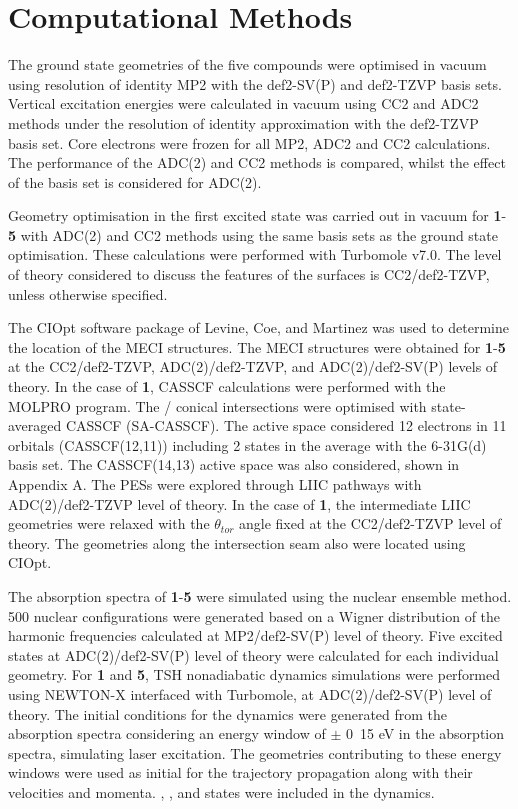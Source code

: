 \section{Computational Methods}\label{section: NRdecay_methods}
The ground state geometries of the five compounds were optimised in vacuum using resolution of identity \acf{MP2} with the def2-SV(P) and def2-TZVP basis sets.\cite{Haase1993,Schafer1992,Weigend2005} Vertical excitation energies were calculated in vacuum using CC2 and \ac{ADC2} methods under the resolution of identity approximation with the def2-TZVP basis set.\cite{Christiansen1995,Hattig2000,Hattig2002,Kohn2003,Hattig2005} Core electrons were frozen for all \ac{MP2}, \ac{ADC2} and CC2 calculations. The performance of the ADC(2) and CC2 methods is compared, whilst the effect of the basis set is considered for ADC(2). 

Geometry optimisation in the first excited state was carried out in vacuum for \textbf{1}-\textbf{5} with ADC(2) and CC2 methods using the same basis sets as the ground state optimisation. These calculations were performed with Turbomole v7.0.\cite{Turbomole} The level of theory considered to discuss the features of the surfaces is CC2/def2-TZVP, unless otherwise specified.

The CIOpt software package of Levine, Coe, and Martinez was used to determine the location of the \acf{MECI} structures.\cite{Levine2008} The MECI structures were obtained for \textbf{1}-\textbf{5} at the CC2/def2-TZVP, ADC(2)/def2-TZVP, and ADC(2)/def2-SV(P) levels of theory. In the case of \textbf{1}, \ac{CASSCF} calculations were performed with the MOLPRO program.\cite{Molpro} The \sone/\szero{} conical intersections were optimised with state-averaged CASSCF (SA-CASSCF). The active space considered 12 electrons in 11 orbitals (CASSCF(12,11)) including 2 states in the average with the 6-31G(d) basis set. The CASSCF(14,13) active space was also considered, shown in Appendix A. The \acp{PES} were explored through \ac{LIIC} pathways with ADC(2)/def2-TZVP level of theory. In the case of \textbf{1}, the intermediate \ac{LIIC} geometries were relaxed with the $\theta_{tor}$ angle fixed at the CC2/def2-TZVP level of theory. The geometries along the intersection seam also were located using CIOpt. 

The absorption spectra of \textbf{1}-\textbf{5} were simulated using the nuclear ensemble method. 500 nuclear configurations were generated based on a Wigner distribution of the harmonic frequencies calculated at MP2/def2-SV(P) level of theory.\cite{Crespo-Otero2012} Five excited states at ADC(2)/def2-SV(P) level of theory were calculated for each individual geometry. For \textbf{1} and \textbf{5}, \acf{TSH} nonadiabatic dynamics simulations were performed using NEWTON-X interfaced with Turbomole, at ADC(2)/def2-SV(P) level of theory.\cite{Barbatti2014} The initial conditions for the dynamics were generated from the absorption spectra considering an energy window of $\pm$ \si{0.15} {eV} in the absorption spectra, simulating laser excitation.\cite{Barbatti2007} The geometries contributing to these energy windows were used as initial for the trajectory propagation along with their velocities and momenta. \szero{}, \sone{}, and \stwo{} states were included in the dynamics. 

